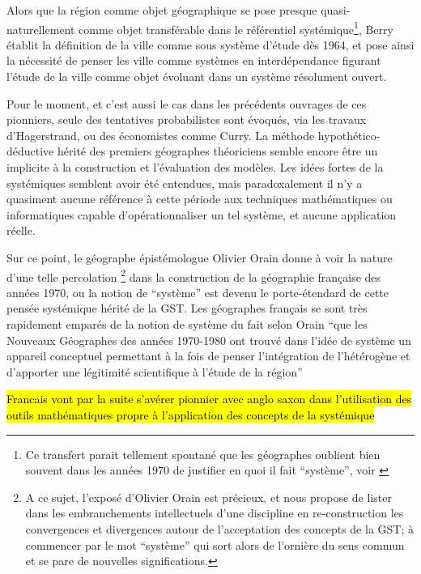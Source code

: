 Alors que la région comme objet géographique se pose presque quasi-naturellement comme objet transférable dans le référentiel systémique\footnote{ Ce transfert parait tellement spontané que les géographes oublient bien souvent dans les années 1970 de justifier en quoi il fait \enquote{système}, voir \autocite{Orain2001}}, Berry établit la définition de la ville comme sous système d'étude dès 1964, et pose ainsi la nécessité de penser les ville comme systèmes en interdépendance figurant l'étude de la ville comme objet évoluant dans un système résolument ouvert. 

Pour le moment, et c'est aussi le cas dans les précédents ouvrages de ces pionniers, seule des tentatives probabilistes sont évoqués, via les travaux d'Hagerstrand, ou des économistes comme Curry. La méthode hypothético-déductive hérité des premiers géographes théoriciens semble encore être un implicite à la construction et l'évaluation des modèles. Les idées fortes de la systémiques semblent avoir été entendues, mais paradoxalement il n'y a quasiment aucune référence à cette période aux techniques mathématiques ou informatiques capable d’opérationnaliser un tel système, et aucune application réelle. \autocite[467-468]{Harvey1969}

Sur ce point, le géographe épistémologue Olivier Orain \autocite{Orain2001} donne à voir la nature d'une telle percolation \footnote{A ce sujet, l'exposé d'Olivier Orain est précieux, et nous propose de lister dans les embranchements intellectuels d'une discipline en re-construction les convergences et divergences autour de l'acceptation des concepts de la GST; à commencer par le mot \enquote{système} qui sort alors de l'ornière du sens commun et se pare de nouvelles significations.} dans la construction de la géographie française des années 1970, ou la notion de \enquote{système} est devenu le porte-étendard de cette pensée systémique hérité de la GST. Les géographes français se sont très rapidement emparés de la notion de système du fait selon Orain \enquote{que les Nouveaux Géographes des années 1970-1980 ont trouvé dans l’idée de système un appareil conceptuel permettant à la fois de penser l’intégration de l’hétérogène et d’apporter une légitimité scientifique à l’étude de la région} \autocite[23]{Orain2001} %

\hl{Francais vont par la suite s'avérer pionnier avec anglo saxon dans l'utilisation des outils mathématiques propre à l'application des concepts de la systémique}

